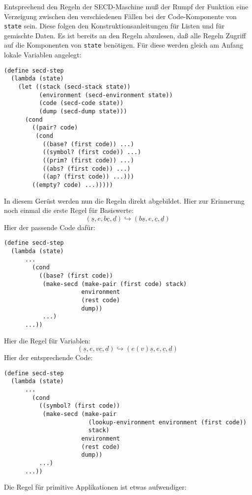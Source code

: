%
Entsprechend den Regeln der SECD-Maschine muß der Rumpf der Funktion
eine Verzeigung zwischen den verschiedenen Fällen bei der
Code-Komponente von \texttt{state} sein.  Diese folgen den
Konstruktionsanleitungen für Listen und für gemischte Daten.  Es ist
bereits an den Regeln abzulesen, daß alle Regeln Zugriff auf die
Komponenten von \texttt{state} benötigen.  Für diese werden gleich am
Anfang lokale Variablen angelegt:
%
\begin{verbatim}
(define secd-step
  (lambda (state)
    (let ((stack (secd-stack state))
          (environment (secd-environment state))
          (code (secd-code state))
          (dump (secd-dump state)))
      (cond
        ((pair? code)
         (cond
           ((base? (first code)) ...)
           ((symbol? (first code)) ...)
           ((prim? (first code)) ...)
           ((abs? (first code)) ...)
           ((ap? (first code)) ...)))
        ((empty? code) ...)))))
\end{verbatim}
%
In diesem Gerüst werden nun die Regeln direkt abgebildet.  Hier zur
Erinnerung noch einmal die erste Regel für Basiswerte:
%
\begin{displaymath}
  (\underline{s}, e, b\underline{c}, \underline{d})
  \hookrightarrow
  (b\underline{s}, e, \underline{c}, \underline{d})
\end{displaymath}
%
Hier der passende Code dafür:
%
\begin{verbatim}
(define secd-step
  (lambda (state)
      ...
        (cond
          ((base? (first code))
           (make-secd (make-pair (first code) stack)
                      environment
                      (rest code)
                      dump))
           ...)
      ...))
\end{verbatim}
%
Hier die Regel für Variablen:
\begin{displaymath}
  (\underline{s}, e, v\underline{c}, \underline{d})
  \hookrightarrow
  (e(v)\underline{s}, e, \underline{c}, \underline{d})
\end{displaymath}
%
Hier der entsprechende Code:
%
\begin{verbatim}
(define secd-step
  (lambda (state)
      ...
        (cond
          ((symbol? (first code))
           (make-secd (make-pair
                        (lookup-environment environment (first code))
                        stack)
                      environment
                      (rest code)
                      dump))
          ...)
      ...))
\end{verbatim}
%
Die Regel für primitive Applikationen ist etwas aufwendiger:

